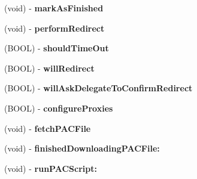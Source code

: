 \begin{DoxyCompactItemize}
\item 
\hypertarget{interface_a_s_i_h_t_t_p_request_07_08_a3218690ab3ce9d401f26f7e0d0e2c995}{
(void) -\/ {\bfseries mark\-As\-Finished}}
\label{interface_a_s_i_h_t_t_p_request_07_08_a3218690ab3ce9d401f26f7e0d0e2c995}

\item 
\hypertarget{interface_a_s_i_h_t_t_p_request_07_08_a2862f6f1db8f1146e96470f926561b93}{
(void) -\/ {\bfseries perform\-Redirect}}
\label{interface_a_s_i_h_t_t_p_request_07_08_a2862f6f1db8f1146e96470f926561b93}

\item 
\hypertarget{interface_a_s_i_h_t_t_p_request_07_08_acedb1516f19af14df7b44602b700bae3}{
(\-B\-O\-O\-L) -\/ {\bfseries should\-Time\-Out}}
\label{interface_a_s_i_h_t_t_p_request_07_08_acedb1516f19af14df7b44602b700bae3}

\item 
\hypertarget{interface_a_s_i_h_t_t_p_request_07_08_af19d1ede897c67a86b4d8a62c6395863}{
(\-B\-O\-O\-L) -\/ {\bfseries will\-Redirect}}
\label{interface_a_s_i_h_t_t_p_request_07_08_af19d1ede897c67a86b4d8a62c6395863}

\item 
\hypertarget{interface_a_s_i_h_t_t_p_request_07_08_a38bb6d3bfc36a47f3ace0665762660ae}{
(\-B\-O\-O\-L) -\/ {\bfseries will\-Ask\-Delegate\-To\-Confirm\-Redirect}}
\label{interface_a_s_i_h_t_t_p_request_07_08_a38bb6d3bfc36a47f3ace0665762660ae}

\item 
\hypertarget{interface_a_s_i_h_t_t_p_request_07_08_a81e707733dd891e98faf51eb37093845}{
(\-B\-O\-O\-L) -\/ {\bfseries configure\-Proxies}}
\label{interface_a_s_i_h_t_t_p_request_07_08_a81e707733dd891e98faf51eb37093845}

\item 
\hypertarget{interface_a_s_i_h_t_t_p_request_07_08_a88a7f8b0dfa6f7cc8214d8b52282c6e6}{
(void) -\/ {\bfseries fetch\-P\-A\-C\-File}}
\label{interface_a_s_i_h_t_t_p_request_07_08_a88a7f8b0dfa6f7cc8214d8b52282c6e6}

\item 
\hypertarget{interface_a_s_i_h_t_t_p_request_07_08_af285a652c6aa3f3b35d7e38d81cac828}{
(void) -\/ {\bfseries finished\-Downloading\-P\-A\-C\-File\-:}}
\label{interface_a_s_i_h_t_t_p_request_07_08_af285a652c6aa3f3b35d7e38d81cac828}

\item 
\hypertarget{interface_a_s_i_h_t_t_p_request_07_08_ac7a6d20750ee1df4ce04ee025b012164}{
(void) -\/ {\bfseries run\-P\-A\-C\-Script\-:}}
\label{interface_a_s_i_h_t_t_p_request_07_08_ac7a6d20750ee1df4ce04ee025b012164}


\end{DoxyCompactItemize}

